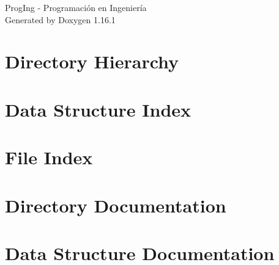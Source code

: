 \documentclass[twoside]{book}
\newcommand{\+}{\discretionary{\mbox{\scriptsize$\hookleftarrow$}}{}{}}
\newcommand{\clearemptydoublepage}{%
    \newpage{\pagestyle{empty}\cleardoublepage}%
  }
\begin{document}
  \raggedbottom
    \hypersetup{pageanchor=false,
                bookmarksnumbered=true,
                pdfencoding=unicode
               }
  \begin{titlepage}
  \vspace*{7cm}
  \begin{center}%
  {\Large Prog\+Ing -\/ Programación en Ingeniería}\\
  \vspace*{1cm}
  {\large Generated by Doxygen 1.16.1}\\
  \end{center}
  \end{titlepage}
  \clearemptydoublepage
  \tableofcontents
  \clearemptydoublepage
  \hypersetup{pageanchor=true}

\chapter{Directory Hierarchy}

\chapter{Data Structure Index}

\chapter{File Index}

\chapter{Directory Documentation}






\chapter{Data Structure Documentation}



\end{document}
